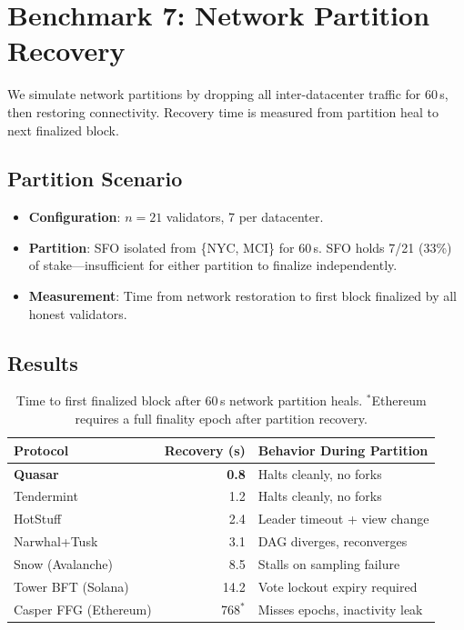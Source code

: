 \section{Benchmark 7: Network Partition Recovery}

\label{sec:partition}

We simulate network partitions by dropping all inter-datacenter traffic for 60\,s, then
restoring connectivity. Recovery time is measured from partition heal to next finalized
block.

\subsection{Partition Scenario}

\begin{itemize}
\item \textbf{Configuration}: $n=21$ validators, 7 per datacenter.
\item \textbf{Partition}: SFO isolated from \{NYC, MCI\} for 60\,s. SFO holds 7/21
      (33\%) of stake---insufficient for either partition to finalize independently.
\item \textbf{Measurement}: Time from network restoration to first block finalized by
      all honest validators.
\end{itemize}

\subsection{Results}

\begin{table}[h]
\centering
\begin{tabular}{@{}lrl@{}}
\toprule
\textbf{Protocol} & \textbf{Recovery (s)} & \textbf{Behavior During Partition} \\
\midrule
\textbf{Quasar}        & \textbf{0.8}  & Halts cleanly, no forks \\
Tendermint             & 1.2           & Halts cleanly, no forks \\
HotStuff               & 2.4           & Leader timeout + view change \\
Narwhal+Tusk           & 3.1           & DAG diverges, reconverges \\
Snow (Avalanche)       & 8.5           & Stalls on sampling failure \\
Tower BFT (Solana)     & 14.2          & Vote lockout expiry required \\
Casper FFG (Ethereum)  & 768$^*$       & Misses epochs, inactivity leak \\
\bottomrule
\end{tabular}
\caption{Time to first finalized block after 60\,s network partition heals.
$^*$Ethereum requires a full finality epoch after partition recovery.}
\label{tab:partition}
\end{table}

